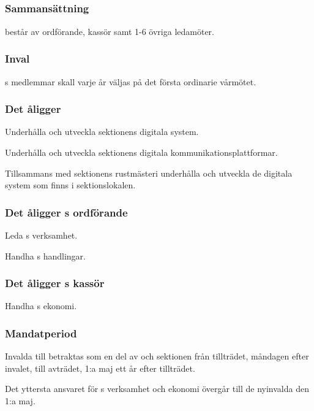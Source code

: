 \subsection{\DIGITFULL}
\subsubsection{Sammansättning}
\DIGIT{} består av ordförande, kassör samt 1-6 övriga ledamöter.

\subsubsection{Inval}
\DIGIT{}s medlemmar skall varje år väljas på det första ordinarie vårmötet.

\subsubsection{Det åligger \DIGIT}
\begin{att}
	\item Underhålla och utveckla sektionens digitala system.
	\item Underhålla och utveckla sektionens digitala kommunikationsplattformar.
	\item Tillsammans med sektionens rustmästeri underhålla och utveckla de digitala system som finns i sektionslokalen.
\end{att}

\subsubsection{Det åligger \DIGIT{}s ordförande}
\begin{att}
	\item Leda \DIGIT{}s verksamhet.
	\item Handha \DIGIT{}s handlingar.
\end{att}

\subsubsection{Det åligger \DIGIT{}s kassör}
\begin{att}
	\item Handha \DIGIT{}s ekonomi.
\end{att}

\subsubsection{Mandatperiod}
Invalda till \DIGIT{} betraktas som en del av \DIGIT{} och sektionen från tillträdet, måndagen efter invalet, till avträdet, 1:a maj ett år efter tillträdet.

Det yttersta ansvaret för \DIGIT{}s verksamhet och ekonomi övergår till de nyinvalda den 1:a maj.


